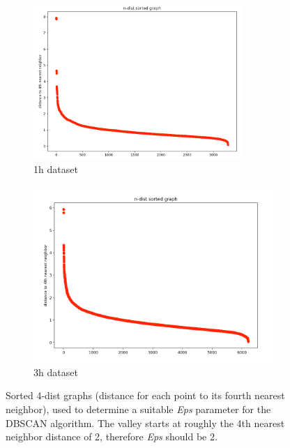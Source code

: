 \begin{figure}[H]
  \centering
  \begin{subfigure}{.5\textwidth}
    \centering
    \includegraphics[width=0.87\textwidth]{./images/kDistGraphDBSCAN1h.png}
  \caption{1h dataset}
  \label{figure:kDistGraphDBSCAN1h}
  \end{subfigure}%
  \hfill
  \begin{subfigure}{.5\textwidth}
    \centering
    \includegraphics[width=1\textwidth]{./images/kDistGraphDBSCAN3h.png}
    \caption{3h dataset}
    \label{figure:kDistGraphDBSCAN3h}
  \end{subfigure}
  \caption{Sorted 4-dist graphs (distance for each point to its fourth nearest neighbor), used to determine a suitable \textit{Eps} parameter for the DBSCAN algorithm. The valley starts at roughly the 4th nearest neighbor distance of 2, therefore \textit{Eps} should be 2.}
  \label{figure:kDistGraphDBSCAN}
  \end{figure}

